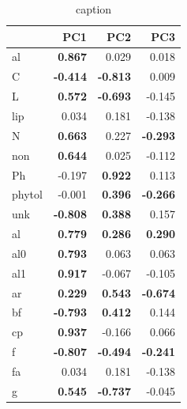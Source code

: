 \documentclass[10pt]{article}
\begin{document}
\begin{flushleft}
\newpage

%





%


\begin{table}[h!]
\centering
\caption{caption} 
\label{cor_pyrpca}
{\small
\begin{tabular}{lrrr}
  \hline
 & PC1 & PC2 & PC3 \\ 
  \hline
al & \textbf{ 0.867 } & 0.029 & 0.018 \\ 
  C & \textbf{ -0.414 } & \textbf{ -0.813 } & 0.009 \\ 
  L & \textbf{ 0.572 } & \textbf{ -0.693 } & -0.145 \\ 
  lip & 0.034 & 0.181 & -0.138 \\ 
  N & \textbf{ 0.663 } & 0.227 & \textbf{ -0.293 } \\ 
  non & \textbf{ 0.644 } & 0.025 & -0.112 \\ 
  Ph & -0.197 & \textbf{ 0.922 } & 0.113 \\ 
  phytol & -0.001 & \textbf{ 0.396 } & \textbf{ -0.266 } \\ 
  unk & \textbf{ -0.808 } & \textbf{ 0.388 } & 0.157 \\ 
  al   & \textbf{ 0.779 } & \textbf{ 0.286 } & \textbf{ 0.290 } \\ 
  al0   & \textbf{ 0.793 } & 0.063 & 0.063 \\ 
  al1   & \textbf{ 0.917 } & -0.067 & -0.105 \\ 
  ar   & \textbf{ 0.229 } & \textbf{ 0.543 } & \textbf{ -0.674 } \\ 
  bf   & \textbf{ -0.793 } & \textbf{ 0.412 } & 0.144 \\ 
  cp   & \textbf{ 0.937 } & -0.166 & 0.066 \\ 
  f   & \textbf{ -0.807 } & \textbf{ -0.494 } & \textbf{ -0.241 } \\ 
  fa   & 0.034 & 0.181 & -0.138 \\ 
  g   & \textbf{ 0.545 } & \textbf{ -0.737 } & -0.045 \\ 

\end{tabular}}
\end{table}
\end{flushleft}
\end{document}
